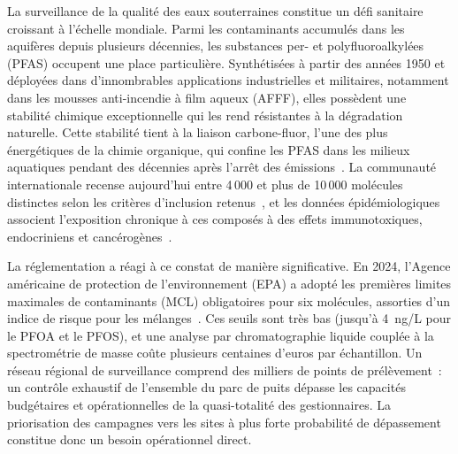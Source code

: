 \label{chap:introduction}

\label{sec:intro-contexte}

La surveillance de la qualit\'e des eaux souterraines constitue un d\'efi sanitaire croissant \`a l'\'echelle mondiale. Parmi les contaminants accumul\'es dans les aquif\`eres depuis plusieurs d\'ecennies, les substances per- et polyfluoroalkyl\'ees (PFAS) occupent une place particuli\`ere. Synth\'etis\'ees \`a partir des ann\'ees 1950 et d\'eploy\'ees dans d'innombrables applications industrielles et militaires, notamment dans les mousses anti-incendie \`a film aqueux (AFFF), elles poss\`edent une stabilit\'e chimique exceptionnelle qui les rend r\'esistantes \`a la d\'egradation naturelle. Cette stabilit\'e tient \`a la liaison carbone-fluor, l'une des plus \'energ\'etiques de la chimie organique, qui confine les PFAS dans les milieux aquatiques pendant des d\'ecennies apr\`es l'arr\^et des \'emissions~\cite{prevedouros2006pfas}. La communaut\'e internationale recense aujourd'hui entre 4\,000 et plus de 10\,000 mol\'ecules distinctes selon les crit\`eres d'inclusion retenus~\cite{gluge2020pfas}, et les donn\'ees \'epid\'emiologiques associent l'exposition chronique \`a ces compos\'es \`a des effets immunotoxiques, endocriniens et canc\'erog\`enes~\cite{sunderland2019pfas}.

La r\'eglementation a r\'eagi \`a ce constat de mani\`ere significative. En 2024, l'Agence am\'ericaine de protection de l'environnement (EPA) a adopt\'e les premi\`eres limites maximales de contaminants (MCL) obligatoires pour six mol\'ecules, assorties d'un indice de risque pour les m\'elanges~\cite{epa2023npdwr}. Ces seuils sont tr\`es bas (jusqu'\`a 4~ng/L pour le PFOA et le PFOS), et une analyse par chromatographie liquide coupl\'ee \`a la spectrom\'etrie de masse co\^ute plusieurs centaines d'euros par \'echantillon. Un r\'eseau r\'egional de surveillance comprend des milliers de points de pr\'el\`evement~: un contr\^ole exhaustif de l'ensemble du parc de puits d\'epasse les capacit\'es budg\'etaires et op\'erationnelles de la quasi-totalit\'e des gestionnaires. La priorisation des campagnes vers les sites \`a plus forte probabilit\'e de d\'epassement constitue donc un besoin op\'erationnel direct.

